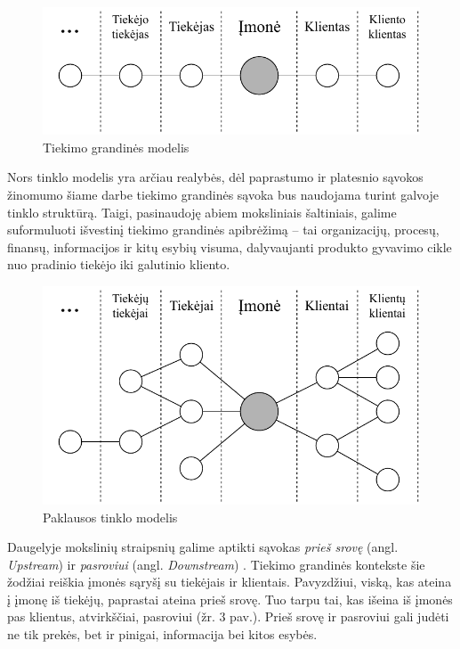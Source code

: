 \begin{figure}[H]
    \centering
    \includegraphics[scale=1]{images/client-supplier-model}
    \caption{Tiekimo grandinės modelis \cite{christopher2016logistics}}
\end{figure}

Nors tinklo modelis yra arčiau realybės, dėl paprastumo ir platesnio sąvokos žinomumo šiame darbe tiekimo grandinės sąvoka bus naudojama turint galvoje tinklo struktūrą. Taigi, pasinaudoję abiem moksliniais šaltiniais, galime suformuluoti išvestinį tiekimo grandinės apibrėžimą – tai organizacijų, procesų, finansų, informacijos ir kitų esybių visuma, dalyvaujanti produkto gyvavimo cikle nuo pradinio tiekėjo iki galutinio kliento.

\begin{figure}[H]
    \centering
    \includegraphics[scale=0.8]{images/demand-network-model}
    \caption{Paklausos tinklo modelis \cite{christopher2016logistics}}
\end{figure}

Daugelyje mokslinių straipsnių galime aptikti sąvokas \textit{prieš srovę} (angl. \textit{Upstream}) ir \textit{pasroviui} (angl. \textit{Downstream}) \cite{croson2005upstream, frohlich2001arcs, vachon2006extending}. Tiekimo grandinės kontekste šie žodžiai reiškia įmonės sąryšį su tiekėjais ir klientais. Pavyzdžiui, viską, kas ateina į įmonę iš tiekėjų, paprastai ateina prieš srovę. Tuo tarpu tai, kas išeina iš įmonės pas klientus, atvirkščiai, pasroviui \cite{christopher2016logistics} (žr. 3 pav.). Prieš srovę ir pasroviui gali judėti ne tik prekės, bet ir pinigai, informacija bei kitos esybės.

